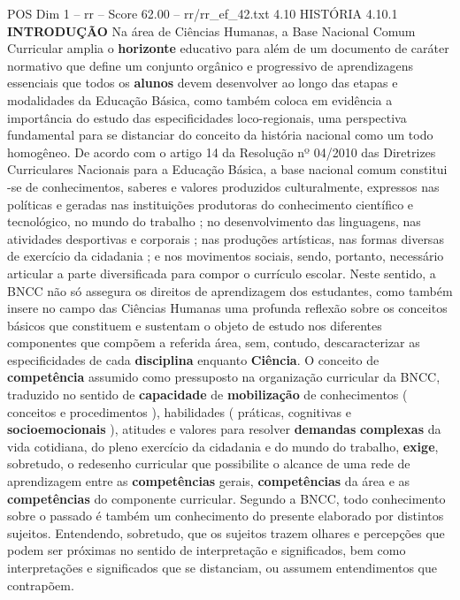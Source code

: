 \begin{textsample}{POS Dim 1 – rr – Score 62.00 – rr/rr\_ef\_42.txt}  \label{ex:f1_pos_212}
4.10 HISTÓRIA 4.10.1 \textbf{INTRODUÇÃO} Na área de Ciências Humanas, a Base Nacional Comum Curricular amplia o \textbf{horizonte} educativo para além de um documento de caráter normativo que define um conjunto orgânico e progressivo de aprendizagens essenciais que todos os \textbf{alunos} devem desenvolver ao longo das etapas e modalidades da Educação Básica, como também coloca em evidência a importância do estudo das especificidades loco-regionais, uma perspectiva fundamental para se distanciar do conceito da história nacional como um todo homogêneo.
De acordo com o artigo 14 da Resolução nº 04/2010 das Diretrizes Curriculares Nacionais para a Educação Básica, a base nacional comum constitui -se de conhecimentos, saberes e valores produzidos culturalmente, expressos nas políticas e geradas nas instituições produtoras do conhecimento científico e tecnológico, no mundo do trabalho ; no desenvolvimento das linguagens, nas atividades desportivas e corporais ; nas produções artísticas, nas formas diversas de exercício da cidadania ; e nos movimentos sociais, sendo, portanto, necessário articular a parte diversificada para compor o currículo escolar.
Neste sentido, a BNCC não só assegura os direitos de aprendizagem dos estudantes, como também insere no campo das Ciências Humanas uma profunda reflexão sobre os conceitos básicos que constituem e sustentam o objeto de estudo nos diferentes componentes que compõem a referida área, sem, contudo, descaracterizar as especificidades de cada \textbf{disciplina} enquanto \textbf{Ciência}.
O conceito de \textbf{competência} assumido como pressuposto na organização curricular da BNCC, traduzido no sentido de \textbf{capacidade} de \textbf{mobilização} de conhecimentos ( conceitos e procedimentos ), habilidades ( práticas, cognitivas e \textbf{socioemocionais} ), atitudes e valores para resolver \textbf{demandas} \textbf{complexas} da vida cotidiana, do pleno exercício da cidadania e do mundo do trabalho, \textbf{exige}, sobretudo, o redesenho curricular que possibilite o alcance de uma rede de aprendizagem entre as \textbf{competências} gerais, \textbf{competências} da área e as \textbf{competências} do componente curricular.
Segundo a BNCC, todo conhecimento sobre o passado é também um conhecimento do presente elaborado por distintos sujeitos.
Entendendo, sobretudo, que os sujeitos trazem olhares e percepções que podem ser próximas no sentido de interpretação e significados, bem como interpretações e significados que se distanciam, ou assumem entendimentos que contrapõem.

\end{textsample}
